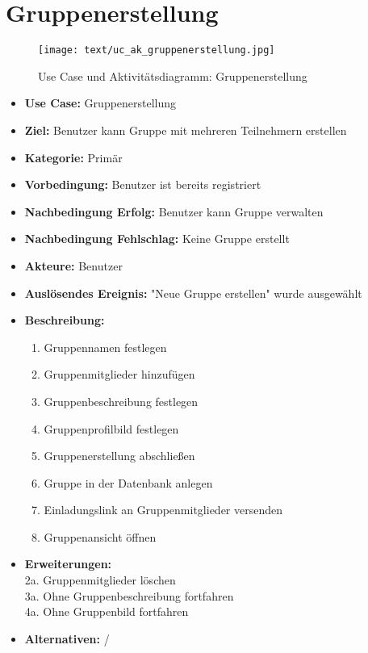 \section{Gruppenerstellung}
\begin{figure}[h!]
	\centering
	\texttt{[image: text/uc\_ak\_gruppenerstellung.jpg]}
	\caption{Use Case und Aktivitätsdiagramm: Gruppenerstellung}
	\label{uc_ac_gruppenerstellung}
\end{figure}
\begin{itemize}
	\item \textbf{Use Case:} Gruppenerstellung
	\item \textbf{Ziel:} Benutzer kann Gruppe mit mehreren Teilnehmern erstellen
	\item \textbf{Kategorie:} Primär
	\item \textbf{Vorbedingung:} Benutzer ist bereits registriert
	\item \textbf{Nachbedingung Erfolg:} Benutzer kann Gruppe verwalten
	\item \textbf{Nachbedingung Fehlschlag:} Keine Gruppe erstellt
	\item \textbf{Akteure:} Benutzer
	\item \textbf{Auslösendes Ereignis:} "Neue Gruppe erstellen" wurde ausgewählt
	\item \textbf{Beschreibung:} \begin{enumerate}
		\item Gruppennamen festlegen
		\item Gruppenmitglieder hinzufügen
		\item Gruppenbeschreibung festlegen
		\item Gruppenprofilbild festlegen
		\item Gruppenerstellung abschließen
		\item Gruppe in der Datenbank anlegen
		\item Einladungslink an Gruppenmitglieder versenden
		\item Gruppenansicht öffnen
	\end{enumerate}
	\item \textbf{Erweiterungen:} \\2a. Gruppenmitglieder löschen\\
	3a. Ohne Gruppenbeschreibung fortfahren\\
	4a. Ohne Gruppenbild fortfahren
	\item \textbf{Alternativen:} /
\end{itemize}

